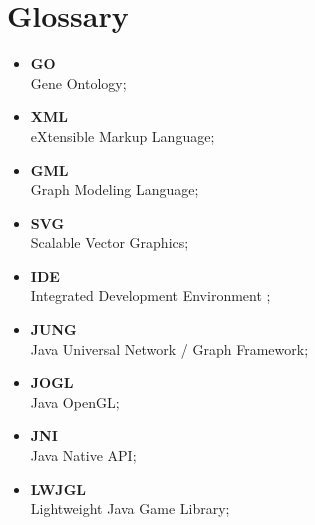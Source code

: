 \section*{Glossary}
\label{sec:glossary}

\begin{itemize}
\item {\bf GO} \\ Gene Ontology;
\item {\bf XML} \\ eXtensible Markup Language;
\item {\bf GML} \\ Graph Modeling Language;
\item {\bf SVG} \\ Scalable Vector Graphics;
\item {\bf IDE} \\ Integrated Development Environment ;
\item {\bf JUNG} \\ Java Universal Network / Graph Framework;
\item {\bf JOGL} \\ Java OpenGL;
\item {\bf JNI} \\ Java Native API;
\item {\bf LWJGL} \\ Lightweight Java Game Library;
\end{itemize}